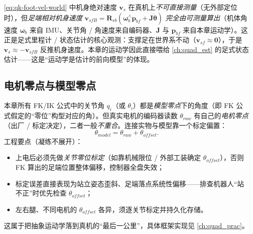 \begin{insight}[要点：足端相对机身速度是状态估计的可测量]\label{ins:qk-vsfB}
\cref{eq:qk-foot-vel-world} 中机身绝对速度 $\boldsymbol{v}_s$ 在真机上\emph{不可直接测量}（无外部定位时），但\emph{足端相对机身速度} $\boldsymbol{v}_{sfB}=\mathbf{R}_{sb}(\boldsymbol{\omega}_b^{\wedge}\boldsymbol{p}_{bf}+\mathbf{J}\dot{\boldsymbol{\theta}})$ \emph{完全由可测量算出}（机体角速度 $\boldsymbol{\omega}_b$ 来自 IMU、关节角 / 角速度来自编码器、$\mathbf{J}$ 与 $\boldsymbol{p}_{bf}$ 来自本章运动学）。这正是足式里程计 / 状态估计的核心观测：支撑足在世界系不动（$\boldsymbol{v}_{sf}\approx\mathbf{0}$），于是 $\boldsymbol{v}_s\approx-\boldsymbol{v}_{sfB}$ 反推机身速度。本章的运动学因此直接喂给 \cref{ch:quad_est} 的足式状态估计——这是“运动学是估计的前向模型”的体现。
\end{insight}

\subsection{电机零点与模型零点}
\label{subsec:qk-motor-zero}

\begin{practice}\label{prac:qk-motor-zero}
本章所有 FK/IK 公式中的关节角 $q_i$（或 $\theta_i$）都是\emph{模型零点}下的角度（即 FK 公式假定的“零位”构型对应的角）。但真实电机的编码器读数 $\theta_{raw}$ 有自己的\emph{电机零点}（出厂 / 标定决定），二者一般\emph{不重合}。连接实物与模型靠一个标定偏置\cite{yu2021quadruped}：
\[
  \theta_{model}=\theta_{raw}+\theta_{offset}.
\]
工程要点（凝练不展开）：
\begin{itemize}
  \item 上电后必须先做\emph{关节零位标定}（如靠机械限位 / 外部工装确定 $\theta_{offset}$），否则 FK 算出的足端位置整体偏移，控制器全盘失效；
  \item 标定误差直接表现为站立姿态歪斜、足端落点系统性偏移——排查机器人“站不正”时优先检查 $\theta_{offset}$；
  \item 左右腿、不同电机的 $\theta_{offset}$ 各异，须逐关节标定并持久化存储。
\end{itemize}
这属于把抽象运动学落到真机的“最后一公里”，具体框架实现见 \cref{ch:quad_prac}。
\end{practice}

